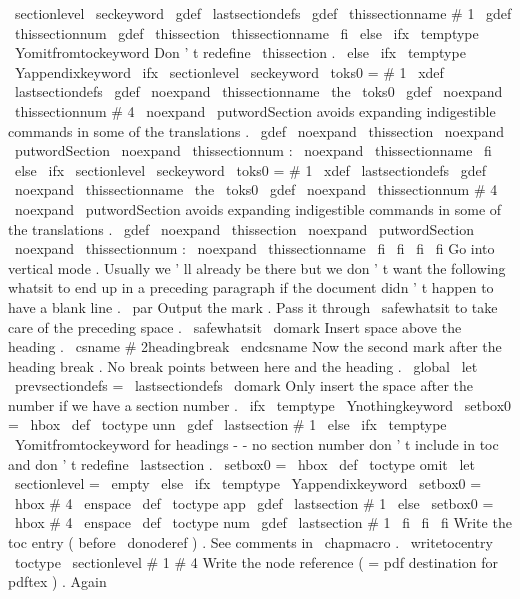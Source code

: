 {{{{{\
sectionlevel
\
seckeyword
\
gdef
\
lastsectiondefs
{
\
gdef
\
thissectionname
{
#
1
}
\
gdef
\
thissectionnum
{
}
%
\
gdef
\
thissection
{
\
thissectionname
}
}
%
\
fi
\
else
\
ifx
\
temptype
\
Yomitfromtockeyword
%
Don
'
t
redefine
\
thissection
.
\
else
\
ifx
\
temptype
\
Yappendixkeyword
\
ifx
\
sectionlevel
\
seckeyword
\
toks0
=
{
#
1
}
%
\
xdef
\
lastsectiondefs
{
%
\
gdef
\
noexpand
\
thissectionname
{
\
the
\
toks0
}
%
\
gdef
\
noexpand
\
thissectionnum
{
#
4
}
%
%
\
noexpand
\
putwordSection
avoids
expanding
indigestible
%
commands
in
some
of
the
translations
.
\
gdef
\
noexpand
\
thissection
{
\
noexpand
\
putwordSection
{
}
\
noexpand
\
thissectionnum
:
\
noexpand
\
thissectionname
}
%
}
%
\
fi
\
else
\
ifx
\
sectionlevel
\
seckeyword
\
toks0
=
{
#
1
}
%
\
xdef
\
lastsectiondefs
{
%
\
gdef
\
noexpand
\
thissectionname
{
\
the
\
toks0
}
%
\
gdef
\
noexpand
\
thissectionnum
{
#
4
}
%
%
\
noexpand
\
putwordSection
avoids
expanding
indigestible
%
commands
in
some
of
the
translations
.
\
gdef
\
noexpand
\
thissection
{
\
noexpand
\
putwordSection
{
}
\
noexpand
\
thissectionnum
:
\
noexpand
\
thissectionname
}
%
}
%
\
fi
\
fi
\
fi
\
fi
%
%
Go
into
vertical
mode
.
Usually
we
'
ll
already
be
there
but
we
%
don
'
t
want
the
following
whatsit
to
end
up
in
a
preceding
paragraph
%
if
the
document
didn
'
t
happen
to
have
a
blank
line
.
\
par
%
%
Output
the
mark
.
Pass
it
through
\
safewhatsit
to
take
care
of
%
the
preceding
space
.
\
safewhatsit
\
domark
%
%
Insert
space
above
the
heading
.
\
csname
#
2headingbreak
\
endcsname
%
%
Now
the
second
mark
after
the
heading
break
.
No
break
points
%
between
here
and
the
heading
.
\
global
\
let
\
prevsectiondefs
=
\
lastsectiondefs
\
domark
%
%
Only
insert
the
space
after
the
number
if
we
have
a
section
number
.
\
ifx
\
temptype
\
Ynothingkeyword
\
setbox0
=
\
hbox
{
}
%
\
def
\
toctype
{
unn
}
%
\
gdef
\
lastsection
{
#
1
}
%
\
else
\
ifx
\
temptype
\
Yomitfromtockeyword
%
for
headings
-
-
no
section
number
don
'
t
include
in
toc
%
and
don
'
t
redefine
\
lastsection
.
\
setbox0
=
\
hbox
{
}
%
\
def
\
toctype
{
omit
}
%
\
let
\
sectionlevel
=
\
empty
\
else
\
ifx
\
temptype
\
Yappendixkeyword
\
setbox0
=
\
hbox
{
#
4
\
enspace
}
%
\
def
\
toctype
{
app
}
%
\
gdef
\
lastsection
{
#
1
}
%
\
else
\
setbox0
=
\
hbox
{
#
4
\
enspace
}
%
\
def
\
toctype
{
num
}
%
\
gdef
\
lastsection
{
#
1
}
%
\
fi
\
fi
\
fi
%
%
Write
the
toc
entry
(
before
\
donoderef
)
.
See
comments
in
\
chapmacro
.
\
writetocentry
{
\
toctype
\
sectionlevel
}
{
#
1
}
{
#
4
}
%
%
%
Write
the
node
reference
(
=
pdf
destination
for
pdftex
)
.
%
Again
}}}}}
